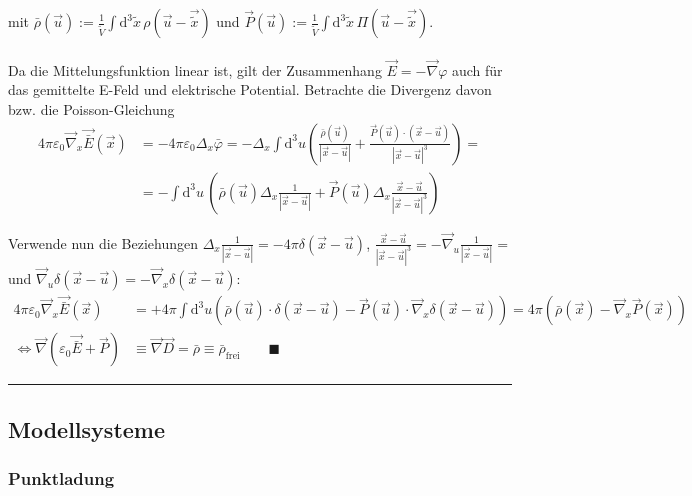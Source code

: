 \documentclass{article}
\newcommand{\diff}{\mathrm{d}}
\newcommand{\lr}[1]{\left(#1\right)}
\begin{document}
{	mit $\bar{\rho}(\vec{u}) := \frac{1}{\tilde{V}} \int \diff^3\tilde{x}\, \rho(\vec{u} - \vec{\tilde{x}})$ und $\vec{P}(\vec{u}) := \frac{1}{\tilde{V}} \int \diff^3\tilde{x}\, \Pi(\vec{u} - \vec{\tilde{x}})$.\\
	\\
	Da die Mittelungsfunktion linear ist, gilt der Zusammenhang $\vec{E} = -\vec{\nabla}\varphi$ auch für das gemittelte E-Feld und elektrische Potential. Betrachte die Divergenz davon bzw. die Poisson-Gleichung
		\begin{align*}
			4\pi\varepsilon_0 \vec{\nabla}_x\vec{\bar{E}}(\vec{x}) &= - 4\pi\varepsilon_0 \Delta_x\bar{\varphi} = -\Delta_x \int \diff^3u \lr{ \frac{\bar{\rho}(\vec{u})}{|\vec{x} - \vec{u}|} + \frac{\vec{P}(\vec{u}) \cdot (\vec{x} - \vec{u})}{|\vec{x} - \vec{u}|^3}} = \\
			&= -\int \diff^3u\, \lr{ \bar{\rho}(\vec{u}) \Delta_x \frac{1}{|\vec{x} - \vec{u}|} + \vec{P}(\vec{u}) \Delta_x \frac{\vec{x} - \vec{u}}{|\vec{x} - \vec{u}|^3} }
		\end{align*}

	Verwende nun die Beziehungen $\Delta_x \frac{1}{|\vec{x} - \vec{u}|} = -4\pi\delta(\vec{x} - \vec{u})$, $\frac{\vec{x} - \vec{u}}{|\vec{x} - \vec{u}|^3} = -\vec{\nabla}_u\frac{1}{|\vec{x} - \vec{u}|} =$ und $\vec{\nabla}_u \delta(\vec{x} - \vec{u}) = - \vec{\nabla}_x \delta(\vec{x} - \vec{u})$:
		\begin{align*}
			4\pi\varepsilon_0 \vec{\nabla}_x\vec{\bar{E}}(\vec{x}) &= +4\pi \int\diff^3u \lr{ \bar{\rho}(\vec{u})\cdot \delta(\vec{x} - \vec{u}) - \vec{P}(\vec{u})\cdot \vec{\nabla}_x\delta(\vec{x} - \vec{u})} = 4\pi \lr{ \bar{\rho}(\vec{x}) - \vec{\nabla}_x\vec{P}(\vec{x}) } \\
			\Leftrightarrow \vec{\nabla}(\varepsilon_0\vec{\bar{E}} + \vec{P}) &\equiv \vec{\nabla}\vec{D} = \bar{\rho} \equiv \bar{\rho}_\text{frei} \qquad \blacksquare
		\end{align*}
\hrule
}


\newpage


\subsection{Modellsysteme}
\subsubsection{Punktladung}
\end{document}

